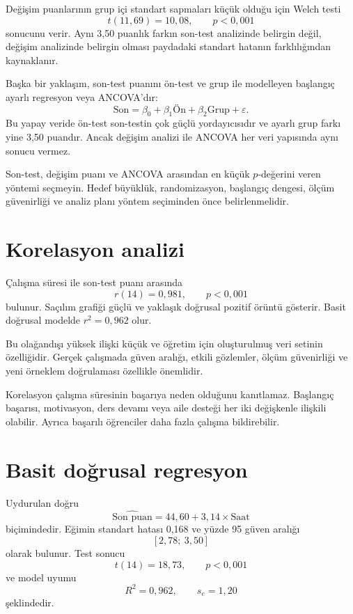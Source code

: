 Değişim puanlarının grup içi standart sapmaları küçük olduğu için Welch testi
\[
t(11{,}69)=10{,}08,
\qquad p<0{,}001
\]
sonucunu verir. Aynı 3,50 puanlık farkın son-test analizinde belirgin değil,
değişim analizinde belirgin olması paydadaki standart hatanın farklılığından
kaynaklanır.

Başka bir yaklaşım, son-test puanını ön-test ve grup ile modelleyen başlangıç
ayarlı regresyon veya ANCOVA'dır:
\[
\text{Son}=\beta_0+\beta_1\text{Ön}+\beta_2\text{Grup}+\varepsilon.
\]
Bu yapay veride ön-test son-testin çok güçlü yordayıcısıdır ve ayarlı grup
farkı yine 3,50 puandır. Ancak değişim analizi ile ANCOVA her veri yapısında
aynı sonucu vermez.

\begin{mistakebox}
Son-test, değişim puanı ve ANCOVA arasından en küçük $p$-değerini veren yöntemi
seçmeyin. Hedef büyüklük, randomizasyon, başlangıç dengesi, ölçüm güvenirliği
ve analiz planı yöntem seçiminden önce belirlenmelidir.
\end{mistakebox}

\section{Korelasyon analizi}

Çalışma süresi ile son-test puanı arasında
\[
r(14)=0{,}981,
\qquad p<0{,}001
\]
bulunur. Saçılım grafiği güçlü ve yaklaşık doğrusal pozitif örüntü gösterir.
Basit doğrusal modelde $r^2=0{,}962$ olur.

Bu olağandışı yüksek ilişki küçük ve öğretim için oluşturulmuş veri setinin
özelliğidir. Gerçek çalışmada güven aralığı, etkili gözlemler, ölçüm
güvenirliği ve yeni örneklem doğrulaması özellikle önemlidir.

Korelasyon çalışma süresinin başarıya neden olduğunu kanıtlamaz. Başlangıç
başarısı, motivasyon, ders devamı veya aile desteği her iki değişkenle ilişkili
olabilir. Ayrıca başarılı öğrenciler daha fazla çalışma bildirebilir.

\section{Basit doğrusal regresyon}

Uydurulan doğru
\[
\widehat{\text{Son puan}}
=44{,}60+3{,}14\times\text{Saat}
\]
biçimindedir. Eğimin standart hatası 0,168 ve yüzde 95 güven aralığı
\[
[2{,}78;\ 3{,}50]
\]
olarak bulunur. Test sonucu
\[
t(14)=18{,}73,
\qquad p<0{,}001
\]
ve model uyumu
\[
R^2=0{,}962,
\qquad s_e=1{,}20
\]
şeklindedir.

